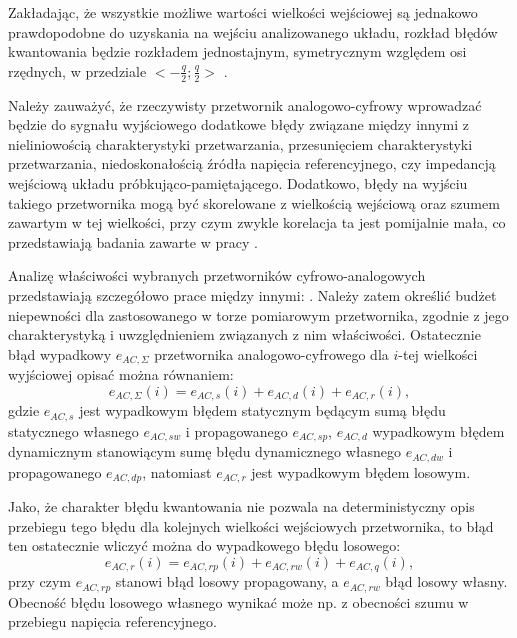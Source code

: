 Zakładając, że wszystkie możliwe wartości wielkości wejściowej są jednakowo prawdopodobne do uzyskania na wejściu analizowanego układu, rozkład błędów kwantowania będzie rozkładem jednostajnym, symetrycznym względem osi rzędnych, w przedziale $<-\frac{q}{2};\frac{q}{2}>$ \cite{jakubiec_system, sienkowski_kwant}.

Należy zauważyć, że rzeczywisty przetwornik analogowo-cyfrowy wprowadzać będzie do sygnału wyjściowego dodatkowe błędy związane między innymi z nieliniowością charakterystyki przetwarzania, przesunięciem charakterystyki przetwarzania, niedoskonałością źródła napięcia referencyjnego, czy impedancją wejściową układu próbkująco-pamiętającego. Dodatkowo, błędy na wyjściu takiego przetwornika mogą być skorelowane z wielkością wejściową oraz szumem zawartym w tej wielkości, przy czym zwykle korelacja ta jest pomijalnie mała, co przedstawiają badania zawarte w pracy \cite{sienkowski_adc}.

Analizę właściwości wybranych przetworników cyfrowo-analogowych przedstawiają szczegółowo prace między innymi: \cite{jakubiec_system, sienkowski_adc, sienkowski_kwant, arpaia_deltasigma}. Należy zatem określić budżet niepewności dla zastosowanego w torze pomiarowym przetwornika, zgodnie z jego charakterystyką i uwzględnieniem związanych z nim właściwości. Ostatecznie błąd wypadkowy $e_{AC,\Sigma}$ przetwornika analogowo-cyfrowego dla $i$-tej wielkości wyjściowej opisać można równaniem:
\begin{equation}
e_{AC,\Sigma}(i) = e_{AC,s}(i) + e_{AC,d}(i) + e_{AC,r}(i) \label{eqn_adc_outerr},
\end{equation}
gdzie $e_{AC,s}$ jest wypadkowym błędem statycznym będącym sumą błędu statycznego własnego $e_{AC,sw}$ i propagowanego $e_{AC,sp}$, $e_{AC,d}$ wypadkowym błędem dynamicznym stanowiącym sumę błędu dynamicznego własnego $e_{AC,dw}$ i propagowanego $e_{AC,dp}$, natomiast $e_{AC,r}$ jest wypadkowym błędem losowym.

Jako, że charakter błędu kwantowania nie pozwala na deterministyczny opis przebiegu tego błędu dla kolejnych wielkości wejściowych przetwornika, to błąd ten ostatecznie wliczyć można do wypadkowego błędu losowego:
\begin{equation}
e_{AC,r}(i) = e_{AC,rp}(i) + e_{AC,rw}(i) + e_{AC,q}(i) \label{eqn_adc_rerr},
\end{equation}
przy czym $e_{AC,rp}$ stanowi błąd losowy propagowany, a $e_{AC,rw}$ błąd losowy własny. Obecność błędu losowego własnego wynikać może np. z obecności szumu w przebiegu napięcia referencyjnego.

